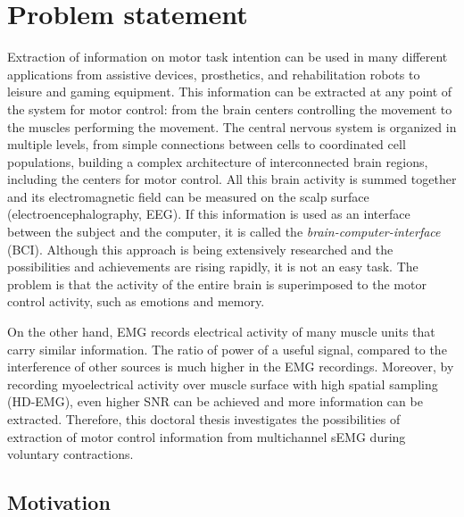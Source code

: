 \chapter{Problem statement}


Extraction of information on motor task intention can be used in many different applications from assistive devices, prosthetics, and rehabilitation robots to leisure and gaming equipment. This information can be extracted at any point of the system for motor control: from the brain centers controlling the movement to the muscles performing the movement. The central nervous system is organized in multiple levels, from simple connections between cells to coordinated cell populations, building a complex architecture of interconnected brain regions, including the centers for motor control. All this brain activity is summed together and its electromagnetic field can be measured on the scalp surface (electroencephalography, EEG). If this information is used as an interface between the subject and the computer, it is called the \emph{brain-computer-interface} (BCI). Although this approach is being extensively researched and the possibilities and achievements are rising rapidly, it is not an easy task. The problem is that the activity of the entire brain is superimposed to the motor control activity, such as emotions and memory.

On the other hand, EMG records electrical activity of many muscle units that carry similar information. The ratio of power of a useful signal, compared to the interference of other sources is much higher in the EMG recordings. Moreover, by recording myoelectrical activity over muscle surface with high spatial sampling (HD-EMG), even higher SNR can be achieved and more information can be extracted. Therefore, this doctoral thesis investigates the possibilities of extraction of motor control information from multichannel sEMG during voluntary contractions.

    
    
    \section{Motivation}
    
